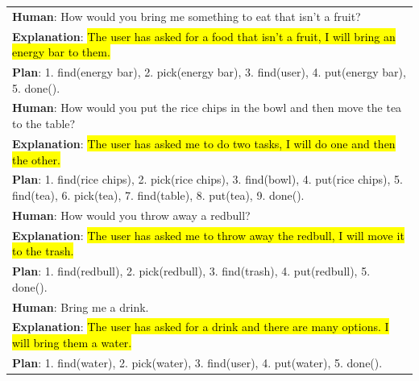 \documentclass[]{article}
\theoremstyle{plain}
\theoremstyle{definition}
\theoremstyle{remark}
\begin{document}
\begin{table}[H]
\begin{tabular}{p{\linewidth}}
\vspace{0mm} \textbf{Human}: How would you bring me something to eat that isn't a fruit? \\ \vspace{-1mm}
\textbf{Explanation}: \hl{The user has asked for a food that isn't a fruit, I will bring an energy bar to them.}  \\
\textbf{Plan}: 1. find(energy bar), 2. pick(energy bar), 3. find(user), 4. put(energy bar), 5. done().  \\
\vspace{0mm} \textbf{Human}: How would you put the rice chips in the bowl and then move the tea to the table? \\
\textbf{Explanation}: \hl{The user has asked me to do two tasks, I will do one and then the other.}  \\
\textbf{Plan}: 1. find(rice chips), 2. pick(rice chips), 3. find(bowl), 4. put(rice chips), 5. find(tea), 6. pick(tea), 7. find(table), 8. put(tea), 9. done(). \\ 
\vspace{0mm} \textbf{Human}: How would you throw away a redbull? \\ \vspace{-1mm}
\textbf{Explanation}: \hl{The user has asked me to throw away the redbull, I will move it to the trash.} \\
\textbf{Plan}: 1. find(redbull), 2. pick(redbull), 3. find(trash), 4. put(redbull), 5. done(). \\
\vspace{0mm} \textbf{Human}: Bring me a drink. \\ \vspace{-1mm}
\textbf{Explanation}: \hl{The user has asked for a drink and there are many options. I will bring them a water.}  \\
\textbf{Plan}: 1. find(water), 2. pick(water), 3. find(user), 4. put(water), 5. done(). \\
        \bottomrule
    \end{tabular}
    \label{tab:appendix-saycan-prompt}
\end{table}
\endgroup


\clearpage
\end{document}
